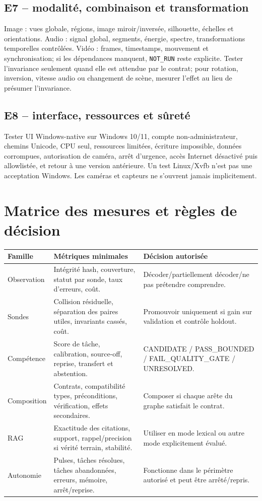 \documentclass[11pt,a4paper,oneside]{report}
\begin{document}
\section{E7 -- modalité, combinaison et transformation}
Image : vues globale, régions, image miroir/inversée, silhouette, échelles et orientations. Audio : signal global, segments, énergie, spectre, transformations temporelles contrôlées. Vidéo : frames, timestamps, mouvement et synchronisation; si les dépendances manquent, \texttt{NOT\_RUN} reste explicite. Tester l'invariance seulement quand elle est attendue par le contrat; pour rotation, inversion, vitesse audio ou changement de scène, mesurer l'effet au lieu de présumer l'invariance.

\section{E8 -- interface, ressources et sûreté}
Tester UI Windows-native sur Windows 10/11, compte non-administrateur, chemins Unicode, CPU seul, ressources limitées, écriture impossible, données corrompues, autorisation de caméra, arrêt d'urgence, accès Internet désactivé puis allowlistée, et retour à une version antérieure. Un test Linux/Xvfb n'est pas une acceptation Windows. Les caméras et capteurs ne s'ouvrent jamais implicitement.

\chapter{Matrice des mesures et règles de décision}
\begin{longtable}{p{3.1cm}p{5.4cm}p{5.1cm}}
\toprule
Famille & Métriques minimales & Décision autorisée \\
\midrule
Observation & Intégrité hash, couverture, statut par sonde, taux d'erreurs, coût. & Décoder/partiellement décoder/ne pas prétendre comprendre. \\
Sondes & Collision résiduelle, séparation des paires utiles, invariants cassés, coût. & Promouvoir uniquement si gain sur validation et contrôle holdout. \\
Compétence & Score de tâche, calibration, source-off, reprise, transfert et abstention. & CANDIDATE / PASS\_BOUNDED / FAIL\_QUALITY\_GATE / UNRESOLVED. \\
Composition & Contrats, compatibilité types, préconditions, vérification, effets secondaires. & Composer si chaque arête du graphe satisfait le contrat. \\
RAG & Exactitude des citations, support, rappel/precision si vérité terrain, stabilité. & Utiliser en mode lexical ou autre mode explicitement évalué. \\
Autonomie & Pulses, tâches résolues, tâches abandonnées, erreurs, mémoire, arrêt/reprise. & Fonctionne dans le périmètre autorisé et peut être arrêté/repris. \\
\bottomrule
\end{longtable}
\end{document}
